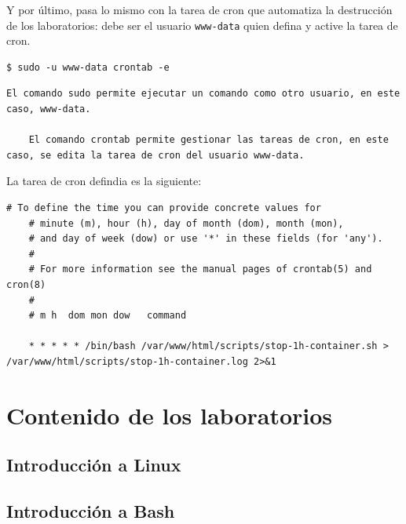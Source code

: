         Y por último, pasa lo mismo con la tarea de cron que automatiza la destrucción de los laboratorios: debe ser el usuario \texttt{www-data} quien defina y active la tarea de cron.
        \\

        \begin{lstlisting}[style=bash_style]
    $ sudo -u www-data crontab -e
        \end{lstlisting}

        \begin{lstlisting}[style=comment_style]
    El comando sudo permite ejecutar un comando como otro usuario, en este caso, www-data.

    El comando crontab permite gestionar las tareas de cron, en este caso, se edita la tarea de cron del usuario www-data.
        \end{lstlisting}

        La tarea de cron defindia es la siguiente:
        \\

        \begin{lstlisting}[style=bash_style, caption={contenido del fichero},captionpos=b, basicstyle=\ttfamily\scriptsize]
    # To define the time you can provide concrete values for
    # minute (m), hour (h), day of month (dom), month (mon),
    # and day of week (dow) or use '*' in these fields (for 'any').
    # 
    # For more information see the manual pages of crontab(5) and cron(8)
    # 
    # m h  dom mon dow   command

    * * * * * /bin/bash /var/www/html/scripts/stop-1h-container.sh > /var/www/html/scripts/stop-1h-container.log 2>&1
        \end{lstlisting}

        \cleardoublepage



\chapter{Contenido de los laboratorios}

    \section{Introducción a Linux}
    
    \section{Introducción a Bash}

